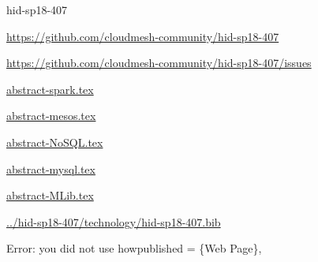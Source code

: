 \begin{IU}

hid-sp18-407

\url{https://github.com/cloudmesh-community/hid-sp18-407}

\url{https://github.com/cloudmesh-community/hid-sp18-407/issues}

\href{https://github.com/cloudmesh-community/hid-sp18-407/blob/master//technology/abstract-spark.tex}{abstract-spark.tex}

\href{https://github.com/cloudmesh-community/hid-sp18-407/blob/master//technology/abstract-mesos.tex}{abstract-mesos.tex}

\href{https://github.com/cloudmesh-community/hid-sp18-407/blob/master//technology/abstract-NoSQL.tex}{abstract-NoSQL.tex}

\href{https://github.com/cloudmesh-community/hid-sp18-407/blob/master//technology/abstract-mysql.tex}{abstract-mysql.tex}

\href{https://github.com/cloudmesh-community/hid-sp18-407/blob/master//technology/abstract-MLib.tex}{abstract-MLib.tex}

\href{https://github.com/cloudmesh-community/hid-sp18-407/blob/master//technology/hid-sp18-407.bib}{../hid-sp18-407/technology/hid-sp18-407.bib}

Error: you did not use howpublished = \{Web Page\},

\end{IU}


